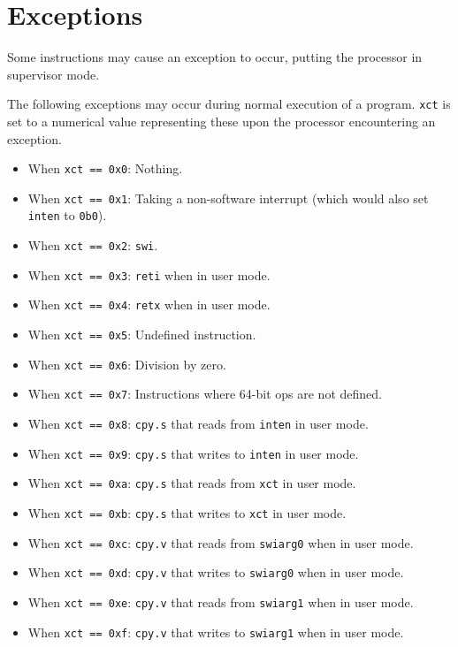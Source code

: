 \documentclass{article}
\begin{document}
\section{Exceptions}
	Some instructions may cause an exception to occur, putting the
	processor in supervisor mode.

	The following exceptions may occur during normal execution of a
	program. \texttt{xct} is set to a numerical value representing these
	upon the processor encountering an exception. 

	\begin{itemize}
	\item When \texttt{xct == 0x0}: Nothing.
	\item When \texttt{xct == 0x1}:
		Taking a non-software interrupt (which would also set \texttt{inten}
		to \texttt{0b0}).
	\item When \texttt{xct == 0x2}: \texttt{swi}.
	\item When \texttt{xct == 0x3}: \texttt{reti} when in user mode.
	\item When \texttt{xct == 0x4}: \texttt{retx} when in user mode.
	\item When \texttt{xct == 0x5}: Undefined instruction.
	\item When \texttt{xct == 0x6}: Division by zero.
	\item When \texttt{xct == 0x7}:
		Instructions where 64-bit ops are not defined.

	\item When \texttt{xct == 0x8}:
		\texttt{cpy.s} that reads from \texttt{inten} in user mode.
	\item When \texttt{xct == 0x9}:
		\texttt{cpy.s} that writes to \texttt{inten} in user mode.
	\item When \texttt{xct == 0xa}:
		\texttt{cpy.s} that reads from \texttt{xct} in user mode.
	\item When \texttt{xct == 0xb}:
		\texttt{cpy.s} that writes to \texttt{xct} in user mode.

	\item When \texttt{xct == 0xc}:
		\texttt{cpy.v} that reads from \texttt{swiarg0} when in user mode.
	\item When \texttt{xct == 0xd}:
		\texttt{cpy.v} that writes to \texttt{swiarg0} when in user mode.
	\item When \texttt{xct == 0xe}:
		\texttt{cpy.v} that reads from \texttt{swiarg1} when in user mode.
	\item When \texttt{xct == 0xf}:
		\texttt{cpy.v} that writes to \texttt{swiarg1} when in user mode.


\end{itemize}
\end{document}

